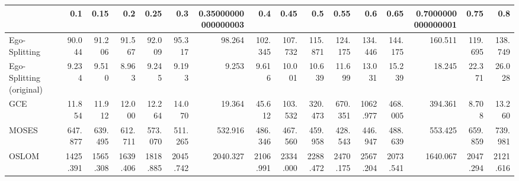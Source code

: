 \begin{tabular}{lrrrrrrrrrrrrrrr}
\toprule
{} &      0.1 &     0.15 &      0.2 &     0.25 &      0.3 & 0.35000000000000003 &      0.4 &     0.45 &      0.5 &     0.55 &      0.6 &     0.65 & 0.7000000000000001 &     0.75 &      0.8 \\
\midrule
Ego-Splitting            &   90.044 &   91.206 &   91.567 &   92.009 &   95.317 &              98.264 &  102.345 &  107.732 &  115.871 &  124.175 &  134.446 &  144.175 &            160.511 &  119.695 &  138.749 \\
Ego-Splitting (original) &    9.234 &    9.510 &    8.963 &    9.245 &    9.193 &               9.253 &    9.616 &   10.001 &   10.639 &   11.699 &   13.031 &   15.239 &             18.245 &   22.371 &   26.028 \\
GCE                      &   11.854 &   11.912 &   12.000 &   12.264 &   14.070 &              19.364 &   45.612 &  103.532 &  320.473 &  670.351 & 1062.977 &  468.005 &            394.361 &    8.708 &   13.260 \\
MOSES                    &  647.877 &  639.495 &  612.711 &  573.070 &  511.265 &             532.916 &  486.346 &  467.560 &  459.958 &  428.543 &  446.947 &  488.639 &            553.425 &  659.859 &  739.981 \\
OSLOM                    & 1425.391 & 1565.308 & 1639.406 & 1818.885 & 2045.742 &            2040.327 & 2106.991 & 2334.000 & 2288.472 & 2470.175 & 2567.204 & 2073.541 &           1640.067 & 2047.294 & 2121.616 \\
\bottomrule
\end{tabular}
